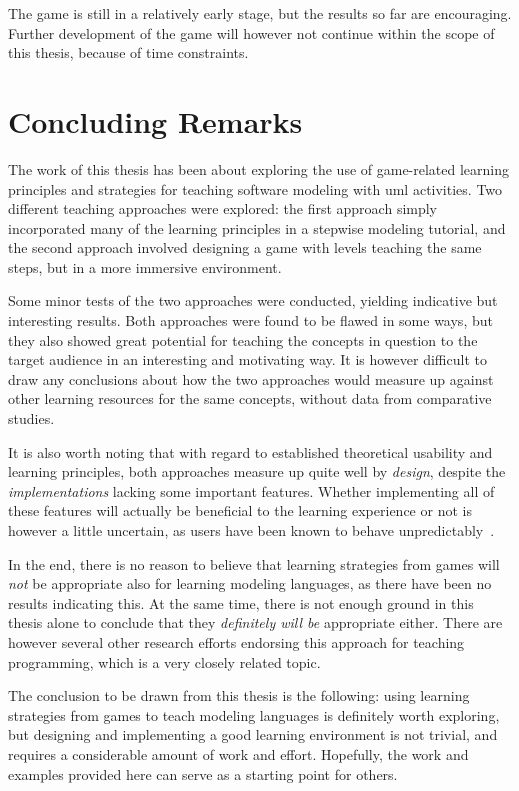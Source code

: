\noindent
The game is still in a relatively early stage, but the results so far are encouraging. Further development of the game will however not continue within the scope of this thesis, because of time constraints.


\section{Concluding Remarks}
\label{sec:concluding_remarks}
The work of this thesis has been about exploring the use of game-related learning principles and strategies for teaching software modeling with \gls{uml} activities. Two different teaching approaches were explored:  the first approach simply incorporated many of the learning principles in a stepwise modeling tutorial, and the second approach involved designing a game with levels teaching the same steps, but in a more immersive environment.

\noindent
Some minor tests of the two approaches were conducted, yielding indicative but interesting results. Both approaches were found to be flawed in some ways, but they also showed great potential for teaching the concepts in question to the target audience in an interesting and motivating way. It is however difficult to draw any conclusions about how the two approaches would measure up against other learning resources for the same concepts, without data from comparative studies.

\noindent
It is also worth noting that with regard to established theoretical usability and learning principles, both approaches measure up quite well by \emph{design}, despite the \emph{implementations} lacking some important features. Whether implementing all of these features will actually be beneficial to the learning experience or not is however a little uncertain, as users have been known to behave unpredictably~\cite{andersen:tutorials_impact}.

\noindent
In the end, there is no reason to believe that learning strategies from games will \emph{not} be appropriate also for learning modeling languages, as there have been no results indicating this. At the same time, there is not enough ground in this thesis alone to conclude that they \emph{definitely will be} appropriate either. There are however several other research efforts endorsing this approach for teaching programming, which is a very closely related topic.

\noindent
The conclusion to be drawn from this thesis is the following: using learning strategies from games to teach modeling languages is definitely worth exploring, but designing and implementing a good learning environment is not trivial, and requires a considerable amount of work and effort. Hopefully, the work and examples provided here can serve as a starting point for others.

